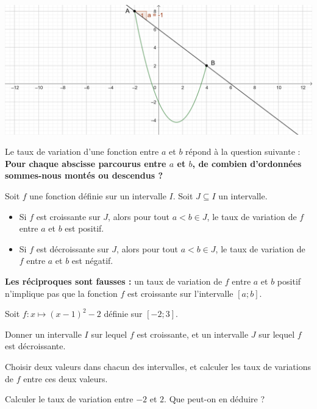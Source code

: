 \documentclass{poly}
\begin{document}
\begin{center}
\includegraphics[width=\textwidth]{Taux_variation_pente.png}
\end{center}
\begin{remark}
Le taux de variation d'une fonction entre $a$ et $b$ répond à la question suivante : \textbf{Pour chaque abscisse parcourus entre $a$ et $b$, de combien d'ordonnées sommes-nous montés ou descendus ?}
\end{remark}
\begin{proposition}
Soit $f$ une fonction définie sur un intervalle $I$. Soit $J \subseteq I$ un intervalle.
\begin{itemize}
\item Si $f$ est croissante sur $J$, alors pour tout $a < b \in J$, le taux de variation de $f$ entre $a$ et $b$ est positif.  
\item Si $f$ est décroissante sur $J$, alors pour tout $a < b \in J$, le taux de variation de $f$ entre $a$ et $b$ est négatif.  
\end{itemize}
\end{proposition}
\begin{remark}
\textbf{Les réciproques sont fausses :} un taux de variation de $f$ entre $a$ et $b$ positif n'implique pas que la fonction $f$ est croissante sur l'intervalle $[a;b]$.
\end{remark}
\begin{example}
Soit $f \colon x \mapsto (x-1)^2 - 2$ définie sur $[-2;3]$.
\begin{alphaquestions}
\item Donner un intervalle $I$ sur lequel $f$ est croissante, et un intervalle $J$ sur lequel $f$ est décroissante.
\item Choisir deux valeurs dans chacun des intervalles, et calculer les taux de variations de $f$ entre ces deux valeurs.

\item Calculer le taux de variation entre $-2$ et $2$. Que peut-on en déduire ?
\end{alphaquestions} 
\end{example}
\newpage
\end{document}

